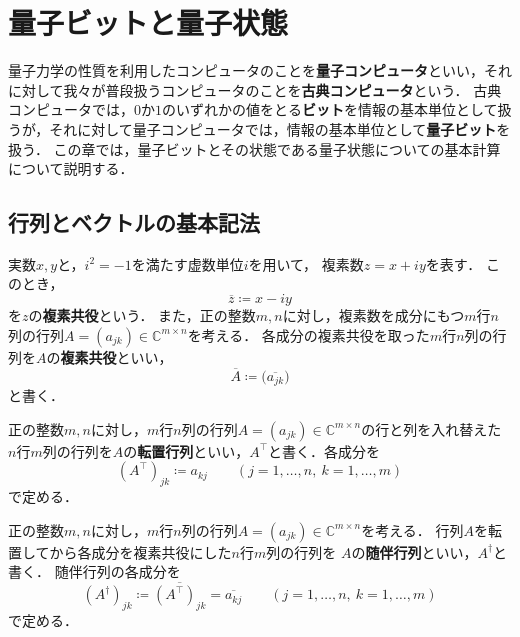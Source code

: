 \section{量子ビットと量子状態}
\label{sec:qubit-state}

量子力学の性質を利用したコンピュータのことを\textbf{量子コンピュータ}といい，それに対して我々が普段扱うコンピュータのことを\textbf{古典コンピュータ}という．
古典コンピュータでは，$0$か$1$のいずれかの値をとる\textbf{ビット}を情報の基本単位として扱うが，それに対して量子コンピュータでは，情報の基本単位として\textbf{量子ビット}を扱う．
この章では，量子ビットとその状態である量子状態についての基本計算について説明する．

\subsection{行列とベクトルの基本記法}

\begin{defi}[複素共役]
実数$x,y$と，$i^2=-1$を満たす虚数単位$i$を用いて，
複素数$z=x+iy$を表す．
このとき，
\begin{equation*}
  \overline{z}\coloneq x-iy
\end{equation*}
を$z$の\textbf{複素共役}という．
また，正の整数$m,n$に対し，複素数を成分にもつ$m$行$n$列の行列$A=(a_{jk}) \in \mathbb{C}^{m\times n}$を考える．
各成分の複素共役を取った$m$行$n$列の行列を$A$の\textbf{複素共役}といい，
\begin{equation*}
  \overline{A}\coloneq\bigl(\overline{a_{jk}}\bigr)
\end{equation*}
と書く．
\end{defi}

\begin{defi}[転置]
正の整数$m,n$に対し，$m$行$n$列の行列$A=(a_{jk}) \in \mathbb{C}^{m\times n}$の行と列を入れ替えた
$n$行$m$列の行列を$A$の\textbf{転置行列}といい，$A^\top$と書く．各成分を
\begin{equation*}
  (A^\top)_{jk}\coloneq a_{kj}
  \qquad (j=1,\ldots,n,\ k=1,\ldots,m)
\end{equation*}
で定める．
\end{defi}

\begin{defi}[随伴行列]
正の整数$m,n$に対し，$m$行$n$列の行列$A=(a_{jk}) \in \mathbb{C}^{m\times n}$を考える．
行列$A$を転置してから各成分を複素共役にした$n$行$m$列の行列を
$A$の\textbf{随伴行列}といい，$A^{\dagger}$と書く．
随伴行列の各成分を
\begin{equation*}
  (A^{\dagger})_{jk}\coloneq\overline{(A^\top)_{jk}}=\overline{a_{kj}}
  \qquad (j=1,\ldots,n,\ k=1,\ldots,m)
\end{equation*}
で定める．
\end{defi}

